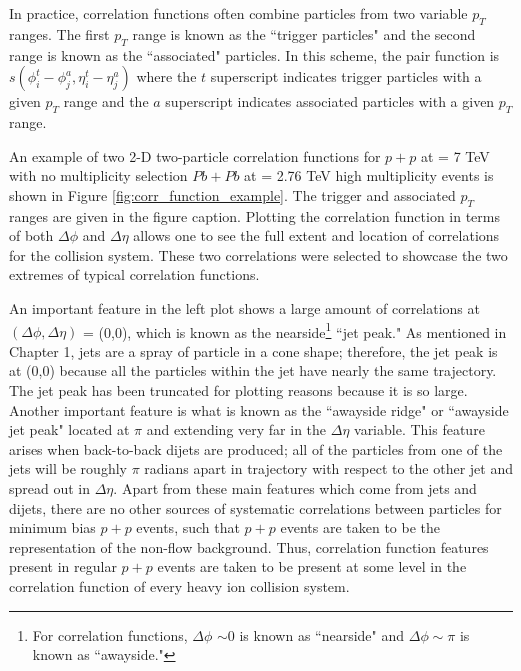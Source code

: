 In practice, correlation functions often combine particles from two variable $p_T$ ranges. The first $p_T$ range is known as the ``trigger particles" and the second range is known as the ``associated" particles. In this scheme, the pair function is $s(\phi_i^t - \phi_j^a,\eta_i^t - \eta_j^a)$ where the $t$ superscript indicates trigger particles with a given $p_T$ range and the $a$ superscript indicates associated particles with a given $p_T$ range. 

An example of two 2-D two-particle correlation functions for $p+p$ at \sqsn = 7 TeV with no multiplicity selection $Pb+Pb$ at \sqsn = 2.76 TeV high multiplicity events is shown in Figure \ref{fig:corr_function_example}. The trigger and associated $p_T$ ranges are given in the figure caption. Plotting the correlation function in terms of both $\Delta\phi$ and $\Delta\eta$ allows one to see the full extent and location of correlations for the collision system. These two correlations were selected to showcase the two extremes of typical correlation functions. 

An important feature in the left plot shows a large amount of correlations at $(\Delta\phi,\Delta\eta)$ = (0,0), which is known as the nearside\footnote{For correlation functions, $\Delta\phi $ $\sim$0 is known as ``nearside" and $\Delta\phi  \sim\pi$ is known as ``awayside."} ``jet peak." As mentioned in Chapter 1, jets are a spray of particle in a cone shape; therefore, the jet peak is at (0,0) because all the particles within the jet have nearly the same trajectory. The jet peak has been truncated for plotting reasons because it is so large. Another important feature is what is known as the ``awayside ridge" or ``awayside jet peak" located at $\pi$ and extending very far in the $\Delta\eta$ variable. This feature arises when back-to-back dijets are produced; all of the particles from one of the jets will be roughly $\pi$ radians apart in trajectory with respect to the other jet and spread out in $\Delta\eta$. Apart from these main features which come from jets and dijets, there are no other sources of systematic correlations between particles for minimum bias $p+p$ events, such that $p+p$ events are taken to be the representation of the non-flow background. Thus, correlation function features present in regular $p+p$ events are taken to be present at some level in the correlation function of every heavy ion collision system.

